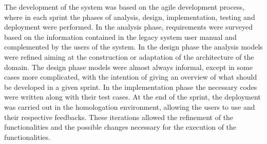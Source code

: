 
The development of the system was based on the agile development process, where in each sprint the phases of analysis, design, implementation, testing and deployment were performed. In the analysis phase, requirements were surveyed based on the information contained in the legacy system user manual and complemented by the users of the system. In the design phase the analysis models were refined aiming at the construction or adaptation of the architecture of the domain. The design phase models were almost always informal, except in some cases more complicated, with the intention of giving an overview of what should be developed in a given sprint. In the implementation phase the necessary codes were written along with their test cases. At the end of the sprint, the deployment was carried out in the homologation environment, allowing the users to use and their respective feedbacks. These iterations allowed the refinement of the functionalities and the possible changes necessary for the execution of the functionalities.


